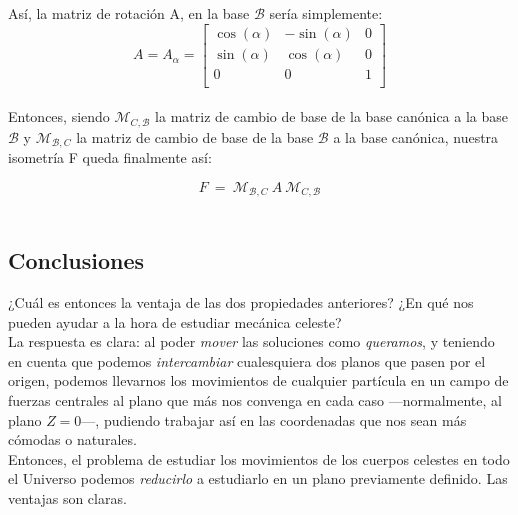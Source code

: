 \documentclass[10pt,a4paper]{article}
\theoremstyle{mystyle}
\begin{document}
Así, la matriz de rotación A, en la base $\mathcal{B}$ sería simplemente:
\[
A=A_{\alpha}=
\begin{bmatrix}
\cos(\alpha) & -\sin(\alpha) & 0 \\
\sin(\alpha) &  \cos(\alpha)  & 0 \\
0 & 0 & 1 \\
\end{bmatrix}
\]\\

Entonces, siendo $\mathcal{M}_{C,\mathcal{B}}$ la matriz de cambio de base de la base canónica a la base $\mathcal{B}$ y $\mathcal{M}_{\mathcal{B},C}$ la matriz de cambio de base de la base $\mathcal{B}$ a la base canónica, nuestra isometría F queda finalmente así:

\[
F\:=\:\mathcal{M}_{\mathcal{B},C}\:A\:\mathcal{M}_{C,\mathcal{B}}
\]\\

\subsection{Conclusiones}
¿Cuál es entonces la ventaja de las dos propiedades anteriores? ¿En qué nos pueden ayudar a la hora de estudiar mecánica celeste?\\

La respuesta es clara: al poder \emph{mover} las soluciones como \emph{queramos}, y teniendo en cuenta que podemos \emph{intercambiar} cualesquiera dos planos que pasen por el origen, podemos llevarnos los movimientos de cualquier partícula en un campo de fuerzas centrales al plano que más nos convenga en cada caso ---normalmente, al plano $Z=0$---, pudiendo trabajar así en las coordenadas que nos sean más cómodas o naturales.\\

Entonces, el problema de estudiar los movimientos de los cuerpos celestes en todo el Universo podemos \emph{reducirlo} a estudiarlo en un plano previamente definido. Las ventajas son claras.

\newpage
\nocite{*}


\end{document}
